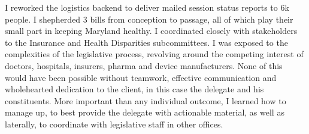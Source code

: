 \documentclass[a4paper]{../res}
\begin{document}
\begin{sloppypar}
\begin{resume}
I reworked the logistics backend to deliver mailed session status reports to 6k people. I shepherded 3 bills from conception to passage, all of which play their small part in keeping Maryland healthy. I coordinated closely with stakeholders to the Insurance and Health Disparities subcommittees. I was exposed to the complexities of the legislative process, revolving around the competing interest of doctors, hospitals, insurers, pharma and device manufacturers. None of this would have been possible without teamwork, effective communication and wholehearted dedication to the client, in this case the delegate and his constituents. More important than any individual outcome, I learned how to manage up, to best provide the delegate with actionable material, as well as laterally, to coordinate with legislative staff in other offices.








\end{resume}
\end{sloppypar}
\end{document}
